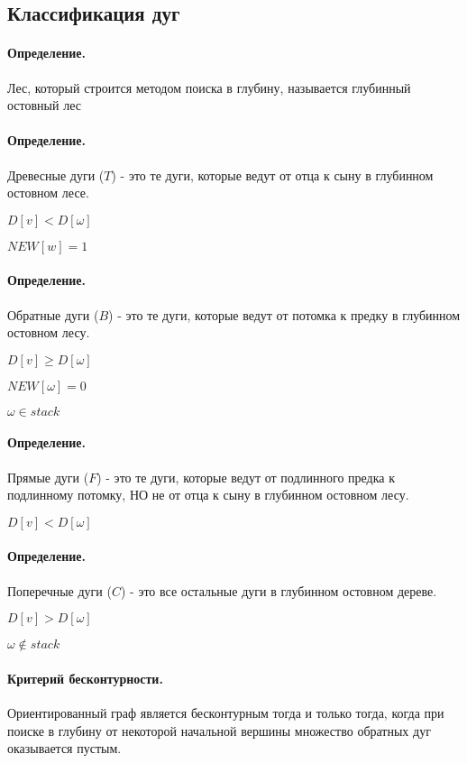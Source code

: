 \documentclass{report}
\begin{document}
\subsection{Классификация дуг}
\paragraph*{Определение.}
Лес, который строится методом поиска в глубину, называется глубинный остовный лес

\paragraph*{Определение.}
Древесные дуги ($T$) - это те дуги, которые ведут от отца к сыну в глубинном остовном лесе.

$D[v] < D[\omega]$

$NEW[w] = 1$

\paragraph*{Определение.}
Обратные дуги ($B$) - это те дуги, которые ведут от потомка к предку в глубинном остовном лесу.

$D[v] \ge  D[\omega]$

$NEW[\omega] = 0$

$\omega \in stack$

\paragraph*{Определение.}
Прямые дуги ($F$) - это те дуги, которые ведут от подлинного предка к подлинному потомку, НО
не от отца к сыну в глубинном остовном лесу.

$D[v] < D[\omega]$

\paragraph*{Определение.}
Поперечные дуги ($C$) - это все остальные дуги в глубинном остовном дереве.

$D[v] > D[\omega]$

$\omega \notin stack $

\paragraph*{Критерий бесконтурности.}
Ориентированный граф является бесконтурным тогда и только тогда, когда при поиске в глубину
от некоторой начальной вершины множество обратных дуг оказывается пустым.
\end{document}

